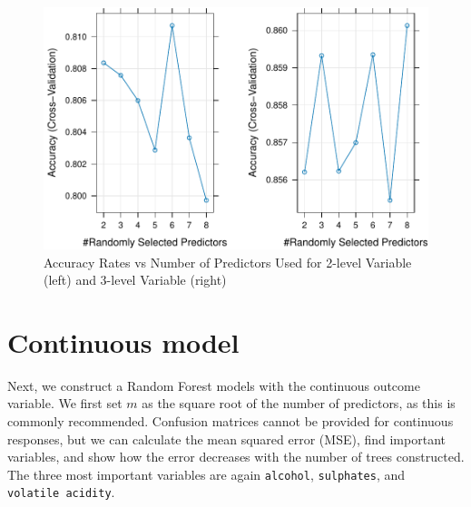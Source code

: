 \documentclass[
]{book}
\begin{document}
\begin{figure}

{\centering \includegraphics[width=1\linewidth,height=1\textheight]{ml-primer_files/figure-latex/rfplots-1} 

}

\caption{Accuracy Rates vs Number of Predictors Used for 2-level Variable (left) and 3-level Variable (right)}\label{fig:rfplots}
\end{figure}

\hypertarget{continuous-model}{%
\section{Continuous model}\label{continuous-model}}

Next, we construct a Random Forest models with the continuous outcome variable. We first set \(m\) as the square root of the number of predictors, as this is commonly recommended. Confusion matrices cannot be provided for continuous responses, but we can calculate the mean squared error (MSE), find important variables, and show how the error decreases with the number of trees constructed. The three most important variables are again \texttt{alcohol}, \texttt{sulphates}, and \texttt{volatile\ acidity}.
\end{document}
